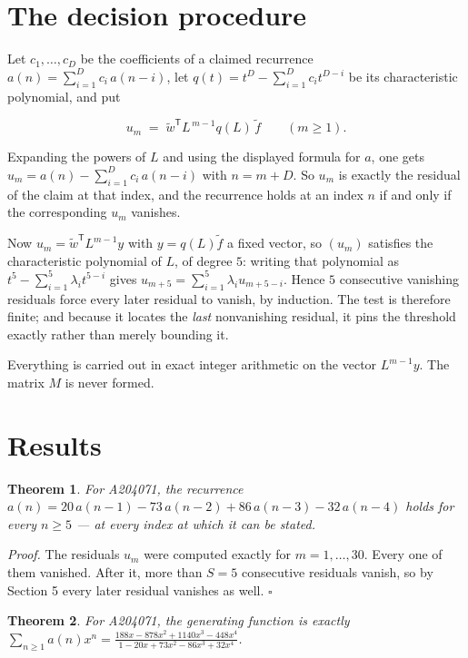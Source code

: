 \documentclass[11pt]{article}
\newtheorem{theorem}{Theorem}
\theoremstyle{definition}
\begin{document}
\section{The decision procedure}

Let $c_1,\dots,c_D$ be the coefficients of a claimed recurrence $a(n) = \sum_{i=1}^{D} c_i\,a(n-i)$, let $q(t) = t^{D} - \sum_{i=1}^{D} c_i t^{D-i}$ be its characteristic polynomial, and put

\[u_m \;=\; \tilde w^{\mathsf T} L^{\,m-1} q(L)\,\tilde f \qquad (m \ge 1).\]

Expanding the powers of $L$ and using the displayed formula for $a$, one gets $u_m = a(n) - \sum_{i=1}^{D} c_i\,a(n-i)$ with $n = m + D$. So $u_m$ is exactly the residual of the claim at that index, and the recurrence holds at an index $n$ if and only if the corresponding $u_m$ vanishes.

Now $u_m = \tilde w^{\mathsf T} L^{m-1} y$ with $y = q(L)\tilde f$ a fixed vector, so $(u_m)$ satisfies the characteristic polynomial of $L$, of degree $5$: writing that polynomial as $t^{5} - \sum_{i=1}^{5} \lambda_i t^{5-i}$ gives $u_{m+5} = \sum_{i=1}^{5} \lambda_i u_{m+5-i}$. Hence $5$ consecutive vanishing residuals force every later residual to vanish, by induction. The test is therefore finite; and because it locates the {\itshape last} nonvanishing residual, it pins the threshold exactly rather than merely bounding it.

Everything is carried out in exact integer arithmetic on the vector $L^{m-1}y$. The matrix $M$ is never formed.

\section{Results}

\begin{theorem} For A204071, the recurrence $a(n) = 20\,a(n-1) - 73\,a(n-2) + 86\,a(n-3) - 32\,a(n-4)$ holds for every $n \ge 5$ --- at every index at which it can be stated.\end{theorem}

{\itshape Proof.} The residuals $u_m$ were computed exactly for $m = 1,\dots,30$. Every one of them vanished. After it, more than $S = 5$ consecutive residuals vanish, so by Section 5 every later residual vanishes as well. $\square$

\begin{theorem} For A204071, the generating function is exactly $\sum_{n\ge 1} a(n)x^n = \frac{188x - 878x^{2} + 1140x^{3} - 448x^{4}}{1 - 20x + 73x^{2} - 86x^{3} + 32x^{4}}$.\end{theorem}
\end{document}
